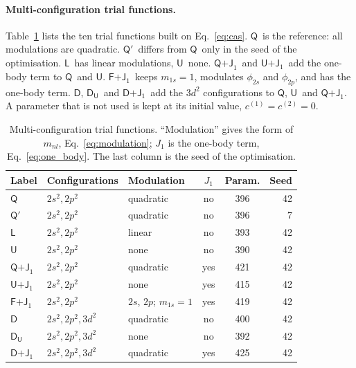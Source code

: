\documentclass[aps,prb,reprint,amsmath,amssymb,superscriptaddress,nofootinbib]{revtex4-2}
\newcommand{\mQ}{\ensuremath{\textsf{Q}}}
\newcommand{\mQb}{\ensuremath{\textsf{Q}'}}
\newcommand{\mL}{\ensuremath{\textsf{L}}}
\newcommand{\mU}{\ensuremath{\textsf{U}}}
\newcommand{\mQJ}{\ensuremath{\textsf{Q+J}_1}}
\newcommand{\mUJ}{\ensuremath{\textsf{U+J}_1}}
\newcommand{\mFJ}{\ensuremath{\textsf{F+J}_1}}
\newcommand{\mD}{\ensuremath{\textsf{D}}}
\newcommand{\mDU}{\ensuremath{\textsf{D}_{\textsf{U}}}}
\newcommand{\mDJ}{\ensuremath{\textsf{D+J}_1}}
\begin{document}
\paragraph{Multi-configuration trial functions.}
Table~\ref{tab:models} lists the ten trial functions built on
Eq.~\eqref{eq:cas}. \mQ\ is the reference: all modulations are quadratic.
\mQb\ differs from \mQ\ only in the seed of the optimisation. \mL\ has
linear modulations, \mU\ none. \mQJ\ and \mUJ\ add the one-body term to \mQ\
and \mU. \mFJ\ keeps $m_{1s} = 1$, modulates $\phi_{2s}$ and $\phi_{2p}$, and
has the one-body term. \mD, \mDU\ and \mDJ\ add the $3d^2$ configurations to
\mQ, \mU\ and \mQJ. A parameter that is not used is kept at its initial value,
$c^{(1)} = c^{(2)} = 0$.

\begin{table}[t]
\caption{Multi-configuration trial functions. ``Modulation'' gives the form of
$m_{nl}$, Eq.~\eqref{eq:modulation}; $J_1$ is the one-body term,
Eq.~\eqref{eq:one_body}. The last column is the seed of the optimisation.}
\label{tab:models}
\centering
\small
\setlength{\tabcolsep}{3.5pt}
\begin{tabular}{lllccr}
\hline\hline
Label & Configurations & Modulation & $J_1$ & Param. & Seed \\
\hline
\mQ   & $2s^2, 2p^2$        & quadratic                & no  & 396 & 42 \\
\mQb  & $2s^2, 2p^2$        & quadratic                & no  & 396 & 7  \\
\mL   & $2s^2, 2p^2$        & linear                   & no  & 393 & 42 \\
\mU   & $2s^2, 2p^2$        & none                     & no  & 390 & 42 \\
\mQJ  & $2s^2, 2p^2$        & quadratic                & yes & 421 & 42 \\
\mUJ  & $2s^2, 2p^2$        & none                     & yes & 415 & 42 \\
\mFJ  & $2s^2, 2p^2$        & $2s$, $2p$; $m_{1s} = 1$ & yes & 419 & 42 \\
\mD   & $2s^2, 2p^2, 3d^2$  & quadratic                & no  & 400 & 42 \\
\mDU  & $2s^2, 2p^2, 3d^2$  & none                     & no  & 392 & 42 \\
\mDJ  & $2s^2, 2p^2, 3d^2$  & quadratic                & yes & 425 & 42 \\
\hline\hline
\end{tabular}
\end{table}
\end{document}
